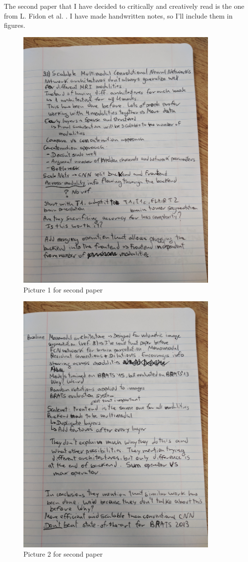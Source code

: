 \documentclass{article}
\begin{document}
The second paper that I have decided to critically and creatively read is the one from L. Fidon et al. \cite{10.1007/978-3-319-66179-7_33}. I have made handwritten notes, so I'll include them in figures.

\begin{figure}[h]
\centering
\includegraphics[width=10cm]{paper2_1.jpg}
\caption{Picture 1 for second paper}
\label{fig:paper2_1}
\end{figure}

\begin{figure}[h]
\centering
\includegraphics[width=10cm]{paper2_2.jpg}
\caption{Picture 2 for second paper}
\label{fig:paper2_2}
\end{figure}
\end{document}
